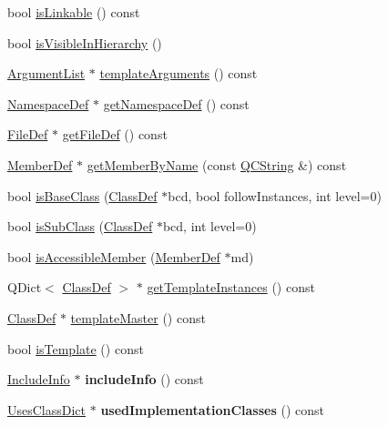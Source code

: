 \begin{DoxyCompactItemize}
\item 
bool \hyperlink{class_class_def_afb5645c0dc69c2f1da67da6e33316e3b}{is\-Linkable} () const 
\item 
bool \hyperlink{class_class_def_a0903a297b1dfa5e537e21ac1bd42d433}{is\-Visible\-In\-Hierarchy} ()
\item 
\hyperlink{class_argument_list}{Argument\-List} $\ast$ \hyperlink{class_class_def_a7a7099c182d85b097ec9b4ac866db827}{template\-Arguments} () const 
\item 
\hyperlink{class_namespace_def}{Namespace\-Def} $\ast$ \hyperlink{class_class_def_a7707ce10899d1b0914f2e95b2d4ecc2a}{get\-Namespace\-Def} () const 
\item 
\hyperlink{class_file_def}{File\-Def} $\ast$ \hyperlink{class_class_def_a5a292ca6db63e5f4a6012dae2af1de08}{get\-File\-Def} () const 
\item 
\hyperlink{class_member_def}{Member\-Def} $\ast$ \hyperlink{class_class_def_ae4b1361bd609c705db962bd9bb8e1afe}{get\-Member\-By\-Name} (const \hyperlink{class_q_c_string}{Q\-C\-String} \&) const 
\item 
bool \hyperlink{class_class_def_ab521566f4d878f44bacb0a2560d993af}{is\-Base\-Class} (\hyperlink{class_class_def}{Class\-Def} $\ast$bcd, bool follow\-Instances, int level=0)
\item 
bool \hyperlink{class_class_def_a81e8ccaa1ddaa3afb6e821c31aa48a0a}{is\-Sub\-Class} (\hyperlink{class_class_def}{Class\-Def} $\ast$bcd, int level=0)
\item 
bool \hyperlink{class_class_def_a9a900cabaf8bd50fa297ea679dfc7716}{is\-Accessible\-Member} (\hyperlink{class_member_def}{Member\-Def} $\ast$md)
\item 
Q\-Dict$<$ \hyperlink{class_class_def}{Class\-Def} $>$ $\ast$ \hyperlink{class_class_def_ad40e3e5176f010fe191043509646d755}{get\-Template\-Instances} () const 
\item 
\hyperlink{class_class_def}{Class\-Def} $\ast$ \hyperlink{class_class_def_aa05f1773a95fb95fbecf82f8c67514c8}{template\-Master} () const 
\item 
bool \hyperlink{class_class_def_a623895be75dc282b0f3af5b18a0cd736}{is\-Template} () const 
\item 
\hypertarget{class_class_def_ac58018f1dfa180cc9c8c622e92e8819b}{\hyperlink{struct_include_info}{Include\-Info} $\ast$ {\bfseries include\-Info} () const }\label{class_class_def_ac58018f1dfa180cc9c8c622e92e8819b}

\item 
\hypertarget{class_class_def_a2b04ff2f8428b80903082077ddbc6388}{\hyperlink{class_uses_class_dict}{Uses\-Class\-Dict} $\ast$ {\bfseries used\-Implementation\-Classes} () const }\label{class_class_def_a2b04ff2f8428b80903082077ddbc6388}


\end{DoxyCompactItemize}
